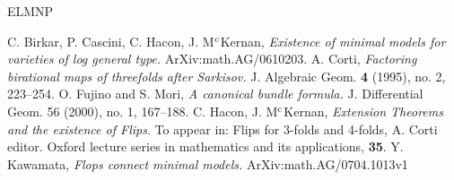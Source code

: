 \documentclass[12pt]{amsart}
\theoremstyle{plain}
\begin{document}
\begin{thebibliography}{ELMNP}

C. Birkar, P. Cascini, C. Hacon, J. M$^{\rm c}$Kernan, \emph{Existence of minimal models for varieties of log general type.} ArXiv:math.AG/0610203.
 A. Corti, \emph{Factoring birational maps of threefolds after Sarkisov.}  J. Algebraic Geom.  {\bf 4}  (1995),  no. 2, 223--254.
O. Fujino and S. Mori, \emph{A canonical bundle formula.}  J. Differential Geom.  56  (2000),  no. 1, 167--188. 
C. Hacon, J. M$^{\rm c}$Kernan, \emph { Extension Theorems and the existence of Flips}. To appear in: Flips for 3-folds and 4-folds, A. Corti editor. Oxford lecture series in mathematics and its applications, {\bf 35}.
Y. Kawamata,
\emph{Flops connect minimal models.} ArXiv:math.AG/0704.1013v1 
\end{thebibliography}
\end{document}
